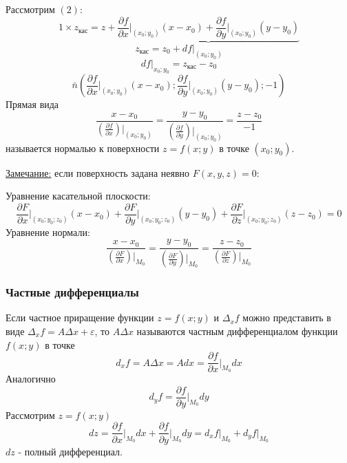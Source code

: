 \documentclass[12pt]{article}
\begin{document}
    Рассмотрим $(2)$:
    \[ 1 \times z_{\text{кас}} = z + \underbrace{\frac{\partial f}{\partial x} \Big|_{(x_0; y_0)} (x-x_0) + \frac{\partial f}{\partial y} \Big|_{(x_0; y_0)} (y-y_0)} \]
    \[ z_{\text{кас}} = z_0 + df \Big|_{(x_0; y_0)} \]
    \[ df \Big|_{x_0; y_0} = z_{\text{кас}} - z_0 \]
    \[ \bar{n} \left(\frac{\partial f}{\partial x} \Big|_{(x_0; y_0)} (x-x_0); \frac{\partial f}{\partial y} \Big|_{(x_0; y_0)} (y-y_0); -1\right) \]
    Прямая вида
    \[ \frac{x - x_0}{\left( \frac{\partial f}{\partial x} \right) \Big|_{(x_0; y_0)}} = \frac{y - y_0}{\left( \frac{\partial f}{\partial y} \right) \Big|_{(x_0; y_0)}} = \frac{z - z_0}{-1} \]
    называется нормалью к поверхности $z = f(x; y)$ в точке $(x_0; y_0)$.\par\noindent
    \underline{Замечание:} если поверхность задана неявно $F(x,y,z) = 0$:
    \begin{adjustwidth}{1.5em}{1.5em}
        Уравнение касательной плоскости: 
        \[ \frac{\partial F}{\partial x} \Big|_{(x_0; y_0; z_0)} (x-x_0) + \frac{\partial F}{\partial y} \Big|_{(x_0; y_0; z_0)} (y-y_0) + \frac{\partial F}{\partial z} \Big|_{(x_0; y_0; z_0)} (z-z_0) = 0 \]
        Уравнение нормали:
        \[ \frac{x - x_0}{\left( \frac{\partial F}{\partial x} \right) \Big|_{M_0}} = \frac{y - y_0}{\left( \frac{\partial F}{\partial y} \right) \Big|_{M_0}} = \frac{z - z_0}{\left( \frac{\partial F}{\partial z} \right) \Big|_{M_0}} \]
    \end{adjustwidth}
    \subsubsection*{Частные дифференциалы}
    Если частное приращение функции $z = f(x;y)$ и $\Delta_x f$ можно представить в виде $\Delta_x f = A \Delta x + \varepsilon$, то $A \Delta x$ называются частным дифференциалом функции $f(x;y)$ в точке 
    \[ d_x f = A\Delta x = Adx = \frac{\partial f}{\partial x} \Big|_{M_0}dx \]
    Аналогично
    \[ d_y f = \frac{\partial f}{\partial y} \Big|_{M_0}dy \]
    Рассмотрим $z = f(x;y)$
    \[ dz = \frac{\partial f}{\partial x} \Big|_{M_0}dx + \frac{\partial f}{\partial y} \Big|_{M_0}dy = d_x f \Big|_{M_0} + d_y f \Big|_{M_0} \]
    $dz$ - полный дифференциал.
\end{document}
